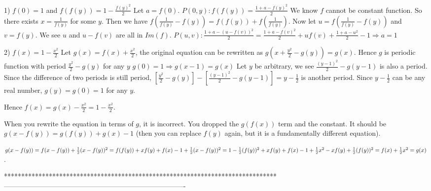 


\begin{solution}
	1) $ f(0) = 1$ and $ f(f(y)) = 1 - \frac {f(y)^2}2$
Let $ a = f(0)$. 
$ P(0,y): f(f(y)) = \frac {1 + a - f(y)^2}2$
We know $ f$ cannot be constant function. So there exists $ x = \frac1{f(y)}$ for some $ y$.
Then we have $ f(\frac1{f(y)} - f(y)) = f(f(y)) + f(\frac1{f(y)})$. 
Now let $ u = f(\frac1{f(y)} - f(y))$ and $ v = f(y)$. We see $ u$ and $ u - f(v)$ are all in $ Im(f)$.
$ P(u,v): \frac {1 + a - (u - f(v))^2}2 = \frac {1 + a - f(v)^2}2 + uf(v) + \frac {1 + a - u^2}2 - 1\Rightarrow a = 1$

2) $ f(x) = 1 - \frac {x^2}2$
Let $ g(x) = f(x) + \frac {x^2}2$, the original equation can be rewritten as
$ g(x + \frac {y^2}2 - g(y)) = g(x)$.
Hence $ g$ is periodic function with period $ \frac {y^2}2 - g(y)$ for any $ y$
$ g(0) = 1\Rightarrow g(x - 1) = g(x)$
Let $ y$ be arbitrary, we see $ \frac {(y - 1)^2}2 - g(y - 1)$ is also a period. Since the difference of two periods is still period, 
$ [\frac {y^2}2 - g(y)] - [\frac {(y - 1)^2}2 - g(y - 1)] = y - \frac12$ is another period.
Since $ y-\frac12$ can be any real number, $ g(y) = g(0) = 1$ for any $ y$.

Hence $ f(x) = g(x) - \frac {x^2}2 = 1 - \frac {x^2}2$.
\end{solution}



\begin{solution}
	When you rewrite the equation in terms of $ g$, it is incorrect. You dropped the $ g(f(x))$ term and the constant. It should be $ g(x-f(y))=g(f(y))+g(x)-1$ (then you can replace $ f(y)$ again, but it is a fundamentally different equation).
\end{solution}



\begin{solution}
	$ g(x-f(y))\\=f(x-f(y))+\frac12(x-f(y))^2\\=f(f(y))+xf(y)+f(x)-1+\frac12(x-f(y))^2\\=1-\frac12(f(y))^2+xf(y)+f(x)-1+\frac12x^2-xf(y)+\frac12(f(y))^2\\=f(x)+\frac12x^2\\=g(x)$.
\end{solution}
*******************************************************************************
-------------------------------------------------------------------------------

